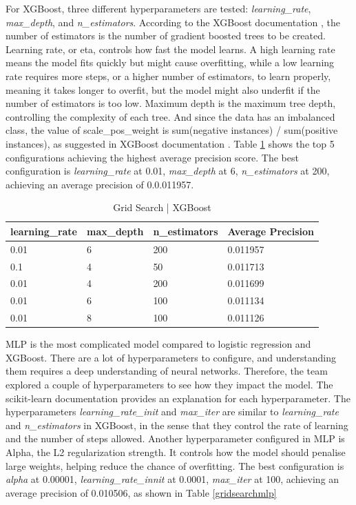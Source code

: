 \documentclass[ %
                    author={Natchalin Iwsakul \\ Inkaphol Siriwongwattana \\ Tanaphan Kummaraphat \\ Patorn Srisupap},
                supervisor={Fernando Moreno-Pino},
                    degree={MSc},
                     title={Propensity Modelling for SME Commercial Lending Using Open Public Data},
                  subtitle={Companies House filings and GDELT media coverage as predictors of first-time borrowing},
                      type={},
                      year={2026}]{dissertation}
\begin{document}
  For XGBoost, three different hyperparameters are tested: \textit{learning\_rate}, \textit{max\_depth}, and \textit{n\_estimators}. According to the XGBoost documentation \cite{noauthor_dmlcxgboost_2026}, the number of estimators is the number of gradient boosted trees to be created. Learning rate, or eta, controls how fast the model learns. A high learning rate means the model fits quickly but might cause overfitting, while a low learning rate requires more steps, or a higher number of estimators, to learn properly, meaning it takes longer to overfit, but the model might also underfit if the number of estimators is too low. Maximum depth is the maximum tree depth, controlling the complexity of each tree. And since the data has an imbalanced class, the value of scale\_pos\_weight is sum(negative instances) / sum(positive instances), as suggested in XGBoost documentation \cite{noauthor_dmlcxgboost_2026}. Table \ref{gridsearchxgboost} shows the top 5 configurations achieving the highest average precision score. The best configuration is \textit{learning\_rate} at 0.01, \textit{max\_depth} at 6, \textit{n\_estimators} at 200, achieving an average precision of 0.0.011957.

  \begin{table}[h]
      \centering
      \begin{tabular}{llll}
      \toprule
          learning\_rate & max\_depth & n\_estimators & Average Precision \\
      \midrule
          0.01 & 6 & 200 & 0.011957 \\
          0.1 & 4 & 50 & 0.011713 \\
          0.01 & 4 & 200 & 0.011699 \\
          0.01 & 6 & 100 & 0.011134 \\
          0.01 & 8 & 100 & 0.011126 \\
      \bottomrule
      \end{tabular}
      \caption{Grid Search | XGBoost}
      \label{gridsearchxgboost}
  \end{table}

  MLP is the most complicated model compared to logistic regression and XGBoost. There are a lot of hyperparameters to configure, and understanding them requires a deep understanding of neural networks. Therefore, the team explored a couple of hyperparameters to see how they impact the model. The scikit-learn documentation \cite{Pedregosa_Scikit-learn_Machine_Learning_2011} provides an explanation for each hyperparameter. The hyperparameters \textit{learning\_rate\_init} and \textit{max\_iter} are similar to \textit{learning\_rate} and \textit{n\_estimators} in XGBoost, in the sense that they control the rate of learning and the number of steps allowed. Another hyperparameter configured in MLP is Alpha, the L2 regularization strength. It controls how the model should penalise large weights, helping reduce the chance of overfitting. The best configuration is \textit{alpha} at 0.00001, \textit{learning\_rate\_innit} at 0.0001, \textit{max\_iter} at 100, achieving an average precision of 0.010506, as shown in Table \ref{gridsearchmlp}
\end{document}
